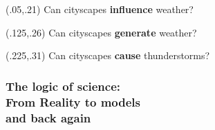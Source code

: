 \documentclass[
paper=128mm:96mm, %
fontsize=11pt, %
pagesize, %
parskip=half-, %
]{scrartcl}
\theoremstyle{mythmstyle} %
\begin{document}
 
\begin{textblock}{1}(.05,.21)
  \normalsize {Can cityscapes \textbf{influence} weather?}
\end{textblock}
 

\begin{textblock}{1}(.125,.26)
  \normalsize {Can cityscapes \textbf{generate} weather?}
\end{textblock}
 
  
\begin{textblock}{1}(.225,.31)
  \normalsize {Can cityscapes \textbf{cause} thunderstorms?}
\end{textblock}

\clearpage

\subsubsection{The logic of science: \\
From Reality to models\\
and back again}
\end{document}
